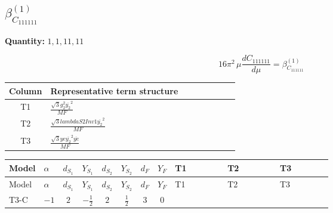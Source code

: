 \documentclass[8pt]{article}
\begin{document}
\begin{landscape}
\section*{$\beta_{C_{111111}}^{(1)}$}
\noindent\textbf{Quantity: }$\mathrm{1,1,11,11}$\par\smallskip
\[16\pi^2\,\mu\frac{d C_{111111}}{d\mu}=\beta_{C_{111111}}^{(1)}\]
\begin{center}
\begin{tabular}{@{}c >{\raggedright\arraybackslash}p{0.82\linewidth}@{}}
\toprule
Column & Representative term structure \\
\midrule
T1 & \(\displaystyle \frac{\sqrt{3} g_{2}^{2} \overline{y_{2}}^{2}}{MF}\) \\
\midrule
T2 & \(\displaystyle \frac{\sqrt{3} lambdaS2Inv1 \overline{y_{2}}^{2}}{MF}\) \\
\midrule
T3 & \(\displaystyle \frac{\sqrt{3} ye \overline{y_{2}}^{2} \overline{ye}}{MF}\) \\
\midrule
\bottomrule
\end{tabular}
\end{center}
\smallskip
\tiny
\begin{longtable}{@{}llcccccc >{\raggedright\arraybackslash}p{0.21\linewidth} >{\raggedright\arraybackslash}p{0.21\linewidth} >{\raggedright\arraybackslash}p{0.21\linewidth}@{}}
\toprule
Model & $\alpha$ & $d_{S_1}$ & $Y_{S_1}$ & $d_{S_2}$ & $Y_{S_2}$ & $d_F$ & $Y_F$ & T1 & T2 & T3 \\
\midrule
\endfirsthead
\toprule
Model & $\alpha$ & $d_{S_1}$ & $Y_{S_1}$ & $d_{S_2}$ & $Y_{S_2}$ & $d_F$ & $Y_F$ & T1 & T2 & T3 \\
\midrule
\endhead
T3-C & $-1$ & $2$ & $-\frac{1}{2}$ & $2$ & $\frac{1}{2}$ & $3$ & $0$ & \scriptsize\adjustbox{max width=\linewidth}{$\begin{gathered} - \frac{\sqrt{3} g_{2}^{2} \overline{y_{2}}^{2}}{4 MF}\end{gathered}$} & \scriptsize\adjustbox{max width=\linewidth}{$\begin{gathered} - \frac{\sqrt{3} lambdaS2Inv1 \overline{y_{2}}^{2}}{6 MF}\end{gathered}$} & \scriptsize\adjustbox{max width=\linewidth}{$\begin{gathered} \frac{\sqrt{3} ye \overline{y_{2}}^{2} \overline{ye}}{12 MF}\end{gathered}$} \\
\midrule
\bottomrule
\end{longtable}
\clearpage

\end{landscape}
\end{document}
